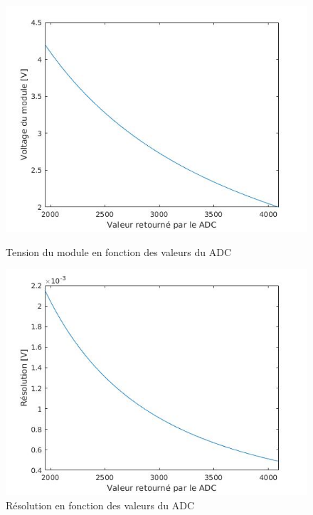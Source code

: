 	\begin{figure}[H]
		\begin{minipage}{0.45\textwidth}
			\centering
			\includegraphics[scale=0.4]{Images/Vmodule_REF_2V.jpg}
			\caption{Tension du module en fonction des valeurs du ADC}
			\label{fig:vmodule_vref}
		\end{minipage}
		\hfill
		\begin{minipage}{0.45\textwidth}
			\centering
			\includegraphics[scale=0.4]{Images/RES_REF_2V.jpg}
			\caption{Résolution en fonction des valeurs du ADC}
			\label{fig:res_vref}
		\end{minipage}	
	\end{figure}	
	
	
	